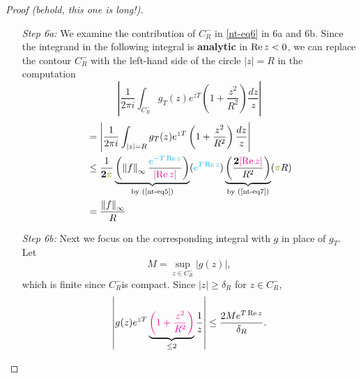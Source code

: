 \documentclass[12pt]{article}
\begin{document}
\begin{proof}[Proof (behold, this one is long!)]
\begin{enumerate}[align=left, label=\textit{Step \arabic*:}]
   
    \item[\textit{Step 6a:}] We examine the contribution of $C_R^-$ in \cref{nt-eq6} in 6a and 6b. Since
    the integrand in the following integral is \textbf{analytic} in $\operatorname{Re} z<0$, we can replace the contour $C_R^-$ with the left-hand side of the circle $|z|=R$ in the
    computation
    \begin{equation}
        \left|\frac{1}{2\pi i} \int_{C_{R}^{-}}g_{T}(z)e^{z T}\left(1+\frac{z^{2}}{R^{2}}\right)\frac{d z}{z}\right|
    \end{equation}
    \begin{equation}\label{nt-eq11}
        \begin{aligned}
            &=\left|\frac{1}{2\pi i}\int_{|z|=R}g_{T}(z)e^{z T}\left(1+\frac{z^{2}}{R^{2}}\right)\frac{d z}{z}\right|\\
            &\leq \frac{1}{\mathbf{2}\gt{\pi}}
            \underbrace{\left(\left\|f\right\|_{\infty}\frac{\bt{e^{-T\re z}}}{\rt{\left|\re z\right|}}\right)}_{\text{by (\ref{nt-eq5})}}(\bt{e^{T\re z}})
            \underbrace{\left(\frac{\mathbf{2}\rt{\left|\re z\right|}}{R^{2}}\right)}_{\text{by (\ref{nt-eq7})}}(\gt{\pi} R)\\
            &=\frac{\left\|f\right\|_{\infty}}{R}
        \end{aligned}
    \end{equation}
    
    \item[\textit{Step 6b:}] Next we focus on the corresponding integral with $g$ in place of $g_T$. Let
    $$
    M=\sup _{z \in C_R^{-}}|g(z)|,
    $$
    which is finite since $C_R^{-}$is compact. Since $|z| \geq \delta_R$ for $z \in C_R^{-}$,
    $$
    \left|g(z) e^{z T}\underbrace{\textcolor{magenta}{\left(1+\frac{z^2}{R^2}\right)}}_{\leq 2} \frac{1}{z}\right| \leq \frac{2 M e^{T \operatorname{Re}  z}}{\delta_R} .
    $$
    

\end{enumerate}
\end{proof}
\end{document}
